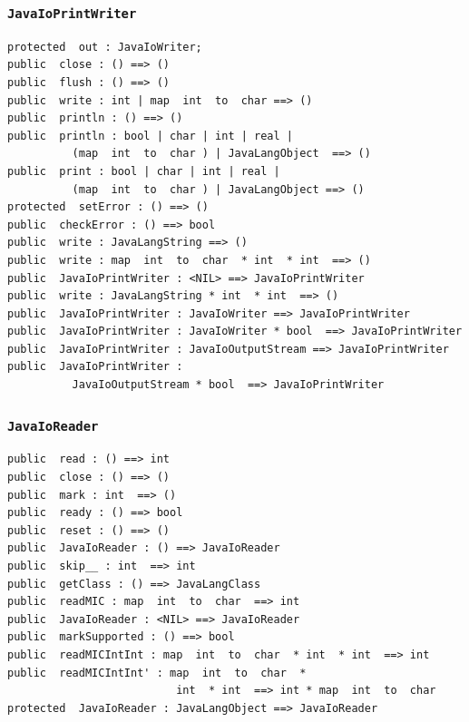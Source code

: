 \documentclass[\pformat,12pt]{article}
\begin{document}
\subsubsection{\texttt{JavaIoPrintWriter}}
\begin{small}
\begin{verbatim}
protected  out : JavaIoWriter;
public  close : () ==> ()
public  flush : () ==> ()
public  write : int | map  int  to  char ==> ()
public  println : () ==> ()
public  println : bool | char | int | real | 
          (map  int  to  char ) | JavaLangObject  ==> ()
public  print : bool | char | int | real | 
          (map  int  to  char ) | JavaLangObject ==> ()
protected  setError : () ==> ()
public  checkError : () ==> bool
public  write : JavaLangString ==> ()
public  write : map  int  to  char  * int  * int  ==> ()
public  JavaIoPrintWriter : <NIL> ==> JavaIoPrintWriter
public  write : JavaLangString * int  * int  ==> ()
public  JavaIoPrintWriter : JavaIoWriter ==> JavaIoPrintWriter
public  JavaIoPrintWriter : JavaIoWriter * bool  ==> JavaIoPrintWriter
public  JavaIoPrintWriter : JavaIoOutputStream ==> JavaIoPrintWriter
public  JavaIoPrintWriter : 
          JavaIoOutputStream * bool  ==> JavaIoPrintWriter
\end{verbatim}
\end{small}

\subsubsection{\texttt{JavaIoReader}}
\begin{small}
\begin{verbatim}
public  read : () ==> int
public  close : () ==> ()
public  mark : int  ==> ()
public  ready : () ==> bool
public  reset : () ==> ()
public  JavaIoReader : () ==> JavaIoReader
public  skip__ : int  ==> int
public  getClass : () ==> JavaLangClass
public  readMIC : map  int  to  char  ==> int
public  JavaIoReader : <NIL> ==> JavaIoReader
public  markSupported : () ==> bool
public  readMICIntInt : map  int  to  char  * int  * int  ==> int
public  readMICIntInt' : map  int  to  char  * 
                          int  * int  ==> int * map  int  to  char
protected  JavaIoReader : JavaLangObject ==> JavaIoReader
\end{verbatim}
\end{small}
\end{document}
